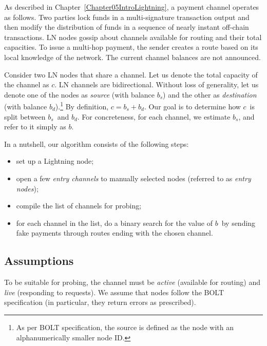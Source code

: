 As described in Chapter~\ref{Chapter05IntroLightning}, a payment channel operates as follows.
Two parties lock funds in a multi-signature transaction output and then modify the distribution of funds in a sequence of nearly instant off-chain transactions.
LN nodes gossip about channels available for routing and their total capacities.
To issue a multi-hop payment, the sender creates a route based on its local knowledge of the network.
The current channel balances are not announced.

Consider two LN nodes that share a channel.
Let us denote the total capacity of the channel as $c$.
LN channels are bidirectional.
Without loss of generality, let us denote one of the nodes as \textit{source} (with balance $b_s$) and the other as \textit{destination} (with balance $b_d$).\footnote{As per BOLT specification, the source is defined as the node with an alphanumerically smaller node ID.}
By definition, $c = b_s + b_d$.
Our goal is to determine how $c$~is split between $b_s$~and $b_d$.
For concreteness, for each channel, we estimate $b_s$, and refer to it simply as $b$.

In a nutshell, our algorithm consists of the following steps:
\begin{itemize}
	\item set up a Lightning node;
	\item open a few \textit{entry channels} to manually selected nodes (referred to as \textit{entry nodes});
	\item compile the list of channels for probing;
	\item for each channel in the list, do a binary search for the value of $b$~by sending fake payments through routes ending with the chosen channel.
\end{itemize}

\subsection{Assumptions}

To be suitable for probing, the channel must be \textit{active} (available for routing) and \textit{live} (responding to requests).
We assume that nodes follow the BOLT specification (in particular, they return errors as prescribed).

